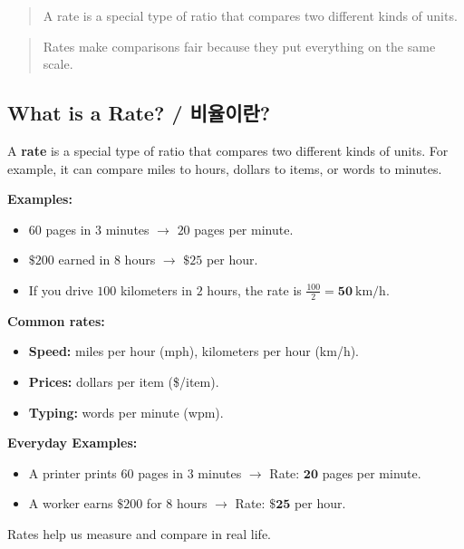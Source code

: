 \blockquote{A rate is a special type of ratio that compares two different kinds of
units.}


\blockquote{Rates make comparisons fair because they put everything on the same scale.}  


\subsection{What is a Rate? / 비율이란?}

A \textbf{rate} is a special type of ratio that compares two different kinds of
units. For example, it can compare miles to hours, dollars to items, or words to
minutes.

\textbf{Examples:}
\begin{itemize}
  \item \(60\) pages in \(3\) minutes \(\rightarrow\) \(20\) pages per minute.
  \item \(\$200\) earned in \(8\) hours \(\rightarrow\) \(\$25\) per hour.
  \item If you drive \(100\) kilometers in \(2\) hours, the rate is \(\displaystyle \frac{100}{2} = \mathbf{50}\ \text{km/h}\).
\end{itemize}

\textbf{Common rates:}
\begin{itemize}
  \item \textbf{Speed:} miles per hour (mph), kilometers per hour (km/h).
  \item \textbf{Prices:} dollars per item (\$/item).
  \item \textbf{Typing:} words per minute (wpm).
\end{itemize}

\textbf{Everyday Examples:}
\begin{itemize}
  \item A printer prints \(60\) pages in \(3\) minutes \(\rightarrow\) Rate: \(\mathbf{20}\) pages per minute.
  \item A worker earns \(\$200\) for \(8\) hours \(\rightarrow\) Rate: \(\mathbf{\$25}\) per hour.
\end{itemize}

Rates help us measure and compare in real life.


